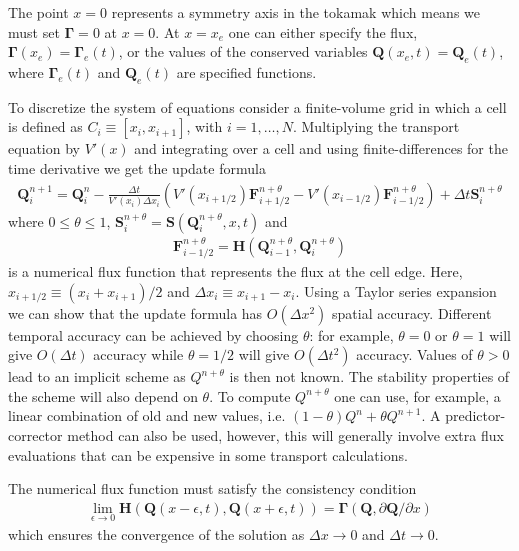 \documentclass[reqno]{amsart}
\newcommand{\pfracb}[2]{\partial #1/\partial #2}
\newcommand{\mvec}[1]{\mathbf{#1}}
\newcommand{\gvec}[1]{\boldsymbol{#1}}
\theoremstyle{definition}
\begin{document}
The point $x=0$ represents a symmetry axis in the tokamak which means
we must set $\gvec{\Gamma}=0$ at $x=0$. At $x=x_e$ one can either
specify the flux, $\gvec{\Gamma}(x_e)=\gvec{\Gamma}_e(t)$, or the
values of the conserved variables $\mvec{Q}(x_e,t)=\mvec{Q}_e(t)$,
where $\gvec{\Gamma}_e(t)$ and $\mvec{Q}_e(t)$ are specified
functions.

To discretize the system of equations consider a finite-volume grid in
which a cell is defined as $C_i \equiv [x_i, x_{i+1}]$, with
$i=1,\ldots,N$. Multiplying the transport equation by $V'(x)$ and
integrating over a cell and using finite-differences for the time
derivative we get the update formula
\begin{align}
  \mvec{Q}_i^{n+1} = \mvec{Q}^n_i - \frac{\Delta t}{V'(x_i) \Delta x_i}
  \left (
    V'(x_{i+1/2}) \mvec{F}_{i+1/2}^{n+\theta} - 
    V'(x_{i-1/2}) \mvec{F}_{i-1/2}^{n+\theta}
  \right)
  +
  \Delta t \mvec{S}_i^{n+\theta} \label{eqn:update-form}
\end{align}
where $0\le\theta\le 1$,
$\mvec{S}_i^{n+\theta}=\mvec{S}(\mvec{Q}_i^{n+\theta},x,t)$ and
\begin{align}
  \mvec{F}_{i-1/2}^{n+\theta} = 
  \mvec{H}(
  \mvec{Q}_{i-1}^{n+\theta},
  \mvec{Q}_i^{n+\theta}
  ) \label{eqn:flux-func}
\end{align}
is a numerical flux function that represents the flux at the cell
edge. Here, $x_{i+1/2} \equiv (x_i+x_{i+1})/2$ and $\Delta x_i \equiv
x_{i+1}-x_i$. Using a Taylor series expansion we can show that the
update formula has $O(\Delta x^2)$ spatial accuracy. Different
temporal accuracy can be achieved by choosing $\theta$: for example,
$\theta=0$ or $\theta=1$ will give $O(\Delta t)$ accuracy while
$\theta=1/2$ will give $O(\Delta t^2)$ accuracy. Values of $\theta>0$
lead to an implicit scheme as $Q^{n+\theta}$ is then not known. The
stability properties of the scheme will also depend on $\theta$. To
compute $Q^{n+\theta}$ one can use, for example, a linear combination
of old and new values, i.e. $(1-\theta)Q^n + \theta Q^{n+1}$. A
predictor-corrector method can also be used, however, this will
generally involve extra flux evaluations that can be expensive in some
transport calculations.

The numerical flux function must satisfy the consistency
condition
\begin{align}
  \lim_{\epsilon\rightarrow 0} \mvec{H}
  \left(
    \mvec{Q}(x-\epsilon,t),
    \mvec{Q}(x+\epsilon,t)
  \right)
  =
  \mvec{\Gamma}(\mvec{Q},\pfracb{\mvec{Q}}{x})
\end{align}
which ensures the convergence of the solution as $\Delta x \rightarrow
0$ and $\Delta t \rightarrow 0$.
\end{document}
